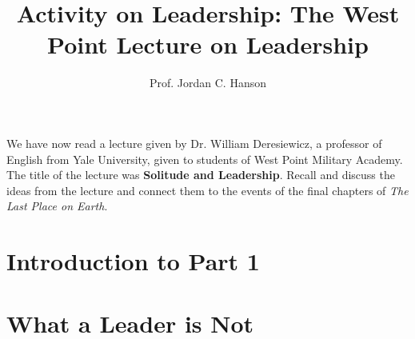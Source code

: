 \documentclass{article}
\begin{document}
\twocolumn

\title{Activity on Leadership: The West Point Lecture on Leadership}
\author{Prof. Jordan C. Hanson}

\maketitle

We have now read a lecture given by Dr. William Deresiewicz, a professor of English from Yale University, given to students of West Point Military Academy.  The title of the lecture was \textbf{Solitude and Leadership}.  Recall and discuss the ideas from the lecture and connect them to the events of the final chapters of \textit{The Last Place on Earth}.

\section{Introduction to Part 1}

\section{What a Leader is Not}
\end{document}
